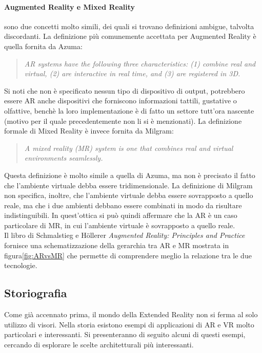         \paragraph{Augmented Reality e Mixed Reality} sono due concetti molto simili, dei quali si trovano definizioni ambigue, talvolta discordanti. La definizione più comunemente
        accettata per Augmented Reality è quella fornita da Azuma\cite{Azuma1997}:
            \begin{quote}
                \textit{AR systems have the following three characteristics: (1) combine real and virtual, (2) are interactive in real time, and (3) are registered in 3D.}
            \end{quote}
            Si noti che non è specificato nessun tipo di dispositivo di output, potrebbero essere  AR anche dispositivi che forniscono informazioni tattili, gustative o olfattive,
            benchè la loro implementazione è di fatto un settore tutt'ora nascente (motivo per il quale precedentemente non li si è menzionati). La definizione formale di 
            Mixed Reality è invece fornita da Milgram\cite{Milgram1994}:
            \begin{quote}
                \textit{A mixed reality (MR) system is one that combines real and virtual environments seamlessly.}
            \end{quote}
            Questa definizione è molto simile a quella di Azuma, ma non è precisato il fatto che l'ambiente virtuale debba essere tridimensionale. La definizione di Milgram non
            specifica, inoltre, che l'ambiente virtuale debba essere sovrapposto a quello reale, ma che i due ambienti debbano essere combinati in modo da risultare indistinguibili. 
            In quest'ottica si può quindi affermare che la AR è un caso particolare di MR, in cui l'ambiente virtuale è sovrapposto a quello reale.\\
            Il libro di Schmalstieg e Höllerer \textit{Augmented Reality: Principles and Practice}\cite{Schmalstieg2016} fornisce una schematizzazione della gerarchia tra AR e MR
            mostrata in figura\ref{fig:ARvsMR} che permette di comprendere meglio la relazione tra le due tecnologie. 
            
    \subsection{Storiografia}\label{subsec:XRstoriografia}
        Come già accennato prima, il mondo della Extended Reality non si ferma al solo utilizzo di visori. Nella storia esistono esempi di applicazioni di AR e VR molto particolari 
        e interessanti. Si presenteranno di seguito alcuni di questi esempi, cercando di esplorare le scelte architetturali più interessanti.
